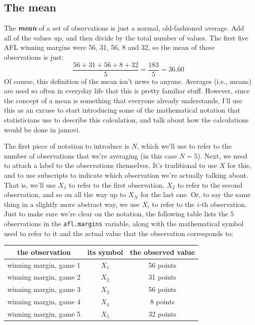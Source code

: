 \documentclass[
]{book}
\begin{document}
\hypertarget{mean}{%
\subsection{The mean}\label{mean}}

The \textbf{\emph{mean}} of a set of observations is just a normal, old-fashioned average. Add all of the values up, and then divide by the total number of values. The first five AFL winning margins were 56, 31, 56, 8 and 32, so the mean of these observations is just:
\[
\frac{56 + 31 + 56 + 8 + 32}{5} = \frac{183}{5} = 36.60
\]
Of course, this definition of the mean isn't news to anyone. Averages (i.e., means) are used so often in everyday life that this is pretty familiar stuff. However, since the concept of a mean is something that everyone already understands, I'll use this as an excuse to start introducing some of the mathematical notation that statisticians use to describe this calculation, and talk about how the calculations would be done in jamovi.

The first piece of notation to introduce is \(N\), which we'll use to refer to the number of observations that we're averaging (in this case \(N = 5\)). Next, we need to attach a label to the observations themselves. It's traditional to use \(X\) for this, and to use subscripts to indicate which observation we're actually talking about. That is, we'll use \(X_1\) to refer to the first observation, \(X_2\) to refer to the second observation, and so on all the way up to \(X_N\) for the last one. Or, to say the same thing in a slightly more abstract way, we use \(X_i\) to refer to the \(i\)-th observation. Just to make sure we're clear on the notation, the following table lists the 5 observations in the \texttt{afl.margins} variable, along with the mathematical symbol used to refer to it and the actual value that the observation corresponds to:

\begin{center}
\begin{tabular}{ccc}
the observation & its symbol & the observed value \\ \hline
winning margin, game 1 & $X_1$ & 56 points \\
winning margin, game 2 & $X_2$ & 31 points \\
winning margin, game 3 & $X_3$ & 56 points \\
winning margin, game 4 & $X_4$ & 8 points \\
winning margin, game 5 & $X_5$ & 32 points \\
\end{tabular}
\end{center}
\end{document}
